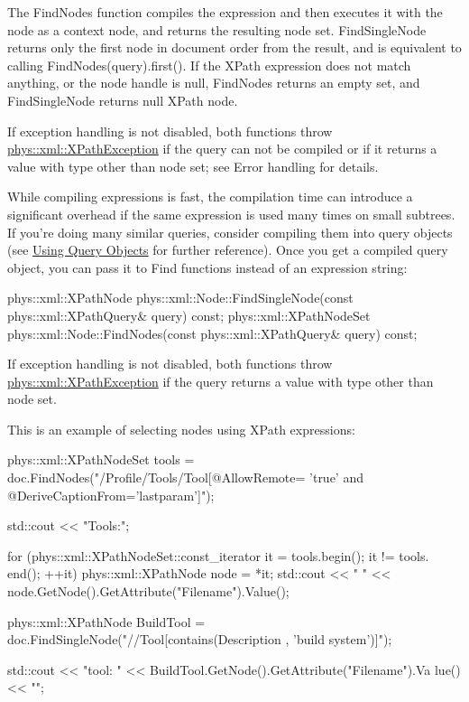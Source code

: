  The FindNodes function compiles the expression and then executes it with the node as a context node, and returns the resulting node set. FindSingleNode returns only the first node in document order from the result, and is equivalent to calling FindNodes(query).first(). If the XPath expression does not match anything, or the node handle is null, FindNodes returns an empty set, and FindSingleNode returns null XPath node. \par
 \par
 If exception handling is not disabled, both functions throw \hyperlink{classphys_1_1xml_1_1XPathException}{phys::xml::XPathException} if the query can not be compiled or if it returns a value with type other than node set; see Error handling for details. \par
 \par
 While compiling expressions is fast, the compilation time can introduce a significant overhead if the same expression is used many times on small subtrees. If you're doing many similar queries, consider compiling them into query objects (see \hyperlink{XMLManual_XMLXPathQuery}{Using Query Objects} for further reference). Once you get a compiled query object, you can pass it to Find functions instead of an expression string: 
\begin{DoxyCode}
 phys::xml::XPathNode phys::xml::Node::FindSingleNode(const 
      phys::xml::XPathQuery& query) const;
 phys::xml::XPathNodeSet phys::xml::Node::FindNodes(const phys::xml::XPathQuery& 
      query) const;
\end{DoxyCode}
 If exception handling is not disabled, both functions throw \hyperlink{classphys_1_1xml_1_1XPathException}{phys::xml::XPathException} if the query returns a value with type other than node set. \par
 \par
 This is an example of selecting nodes using XPath expressions: 
\begin{DoxyCode}
 phys::xml::XPathNodeSet tools = doc.FindNodes("/Profile/Tools/Tool[@AllowRemote=
      'true' and @DeriveCaptionFrom='lastparam']");

 std::cout << "Tools:";

 for (phys::xml::XPathNodeSet::const_iterator it = tools.begin(); it != tools.
      end(); ++it)
 {
     phys::xml::XPathNode node = *it;
     std::cout << " " << node.GetNode().GetAttribute("Filename").Value();
 }

 phys::xml::XPathNode BuildTool = doc.FindSingleNode("//Tool[contains(Description
      , 'build system')]");

 std::cout << "\nBuild tool: " << BuildTool.GetNode().GetAttribute("Filename").Va
      lue() << "\n";
\end{DoxyCode}
